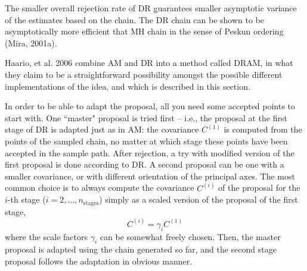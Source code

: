 The smaller overall rejection rate of DR guarantees smaller asymptotic variance of the estimates based on the chain. The DR chain can be shown to be asymptotically more efficient that MH chain in the sense of Peskun ordering (Mira, 2001a). 

% 
% 
% 


Haario, et al. 2006 \cite{HaLaMiSa06} combine AM and DR into a method called DRAM, in what they claim to be a straightforward possibility amongst the possible different implementations of the idea, and which is described in this section.

In order to be able to adapt the proposal, all you need some accepted points to start with. 
%
One ``master" proposal is tried first -- i.e., the proposal at the first stage of DR is adapted just as in AM: the covariance $C^{(1)}$  is computed from the points of the sampled chain, no matter at which stage these points have been accepted in the sample path. 
After rejection, a try with modified version of the first proposal is done according to DR. A second proposal can be one with a smaller covariance, or with different orientation of the principal axes. The most common choice is to always compute the covariance $C^{(i)}$  of the proposal for the $i$-th stage ($i=2,\ldots, n_\text{stages}$) simply as a scaled version of the proposal of the first stage, $$C^{(i)} = \gamma_i C^{(1)}$$ where the scale factors $\gamma_i$ can be somewhat freely chosen. Then, the master proposal is adapted using the chain generated so far, and the second stage proposal follows the adaptation in obvious manner. %



